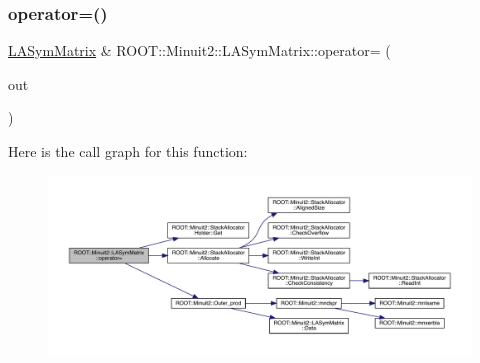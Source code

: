 \subsubsection{\texorpdfstring{operator=()}{operator=()}\hspace{0.1cm}{\footnotesize\ttfamily [20/21]}}
{\footnotesize\ttfamily \mbox{\hyperlink{classROOT_1_1Minuit2_1_1LASymMatrix}{L\+A\+Sym\+Matrix}} \& R\+O\+O\+T\+::\+Minuit2\+::\+L\+A\+Sym\+Matrix\+::operator= (\begin{DoxyParamCaption}\item[{const \mbox{\hyperlink{classROOT_1_1Minuit2_1_1ABObj}{A\+B\+Obj}}$<$ \mbox{\hyperlink{classROOT_1_1Minuit2_1_1sym}{sym}}, \mbox{\hyperlink{classROOT_1_1Minuit2_1_1VectorOuterProduct}{Vector\+Outer\+Product}}$<$ \mbox{\hyperlink{classROOT_1_1Minuit2_1_1ABObj}{A\+B\+Obj}}$<$ \mbox{\hyperlink{classROOT_1_1Minuit2_1_1vec}{vec}}, \mbox{\hyperlink{classROOT_1_1Minuit2_1_1LAVector}{L\+A\+Vector}}, double $>$, double $>$, double $>$ \&}]{out }\end{DoxyParamCaption})}

Here is the call graph for this function\+:
\nopagebreak
\begin{figure}[H]
\begin{center}
\leavevmode
\includegraphics[width=350pt]{d3/d72/classROOT_1_1Minuit2_1_1LASymMatrix_a6d385d24fe98b336532837ad39f5c615_cgraph}
\end{center}
\end{figure}
\mbox{\label{classROOT_1_1Minuit2_1_1LASymMatrix_a166f84f8396e20c14225ae139ba6af25}} 
